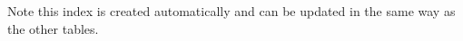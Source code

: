 
\printindex
 
Note this index is created automatically and can be updated in the same way as the other tables.
